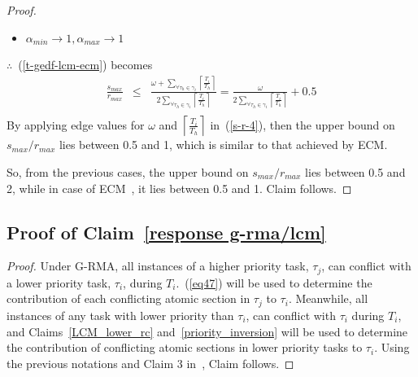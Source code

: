 \documentclass[conference]{sig-alternate}
\begin{document}
\begin{proof}
\begin{itemize}
\item $\alpha_{min} \rightarrow 1, \alpha_{max} \rightarrow 1$
\end{itemize}
$\therefore$~(\ref{t-gedf-lcm-ecm}) becomes
\begin{eqnarray}
\frac{s_{max}}{r_{max}}& \le & \frac{\omega+\sum_{\forall \tau_h \in \gamma_i}\left\lceil\frac{T_i}{T_h}\right\rceil}{2\sum_{\forall \tau_h \in \gamma_i}\left\lceil\frac{T_i}{T_h}\right\rceil} = \frac{\omega}{2\sum_{\forall \tau_h \in \gamma_i}\left\lceil\frac{T_i}{T_h}\right\rceil}+0.5\nonumber\\
\label{s-r-4}\end{eqnarray}
By applying edge values for $\omega$ and $\left\lceil\frac{T_i}{T_h}\right\rceil$ in~(\ref{s-r-4}), then the upper bound on $s_{max}/r_{max}$ lies between 0.5 and 1, which is similar to that achieved by ECM.

So, from the previous cases, the upper bound on $s_{max}/r_{max}$ lies between 0.5 and 2, while in case of ECM~\cite{stmconcurrencycontrol:emsoft11}, it lies between 0.5 and 1. Claim follows.
\end{proof}
\subsection{\label{proof_response g-rma/lcm}Proof of Claim~\ref{response g-rma/lcm}}
\begin{proof}
Under G-RMA, all instances of a higher priority task, $\tau_{j}$, can conflict with a lower priority task,
$\tau_{i}$, during $T_{i}$.~(\ref{eq47}) will be used to determine the contribution of each conflicting atomic section in $\tau_j$ to $\tau_i$. Meanwhile, all instances of any task with lower priority than $\tau_{i}$, can conflict with $\tau_i$ during $T_{i}$, and Claims~\ref{LCM_lower_rc} and~\ref{priority_inversion} will be used to determine the contribution of conflicting atomic sections in lower priority tasks to $\tau_i$.
%
Using the previous notations and Claim 3 in~\cite{stmconcurrencycontrol:emsoft11}, Claim follows.
\end{proof}
\end{document}
